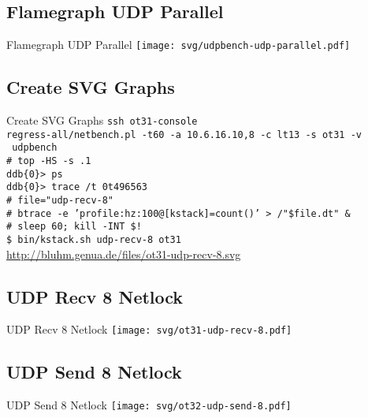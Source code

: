 \documentclass[14pt,aspectratio=169]{beamer}
\begin{document}
\subsection{Flamegraph UDP Parallel}
\begin{frame}{Flamegraph UDP Parallel}
    \texttt{[image: svg/udpbench-udp-parallel.pdf]}
\end{frame}

\subsection{Create SVG Graphs}
\begin{frame}{Create SVG Graphs}
\small
\texttt{ssh ot31-console}\\
\texttt{regress-all/netbench.pl -t60 -a 10.6.16.10,8 -c lt13 -s ot31 -v \\}
\texttt{ udpbench}\\
\texttt{\# top -HS -s .1}\\
\texttt{ddb\{0\}> ps}\\
\texttt{ddb\{0\}> trace /t 0t496563}\\
\texttt{\# file="udp-recv-8"}\\
\texttt{\# btrace -e 'profile:hz:100{@[kstack]=count()}' >~/"\$file.dt" \&}\\
\texttt{\# sleep 60; kill -INT \$!}\\
\texttt{\$ bin/kstack.sh udp-recv-8 ot31}\\
\url{http://bluhm.genua.de/files/ot31-udp-recv-8.svg}\\
\end{frame}

\subsection{UDP Recv 8 Netlock}
\begin{frame}{UDP Recv 8 Netlock}
    \texttt{[image: svg/ot31-udp-recv-8.pdf]}
\end{frame}

\subsection{UDP Send 8 Netlock}
\begin{frame}{UDP Send 8 Netlock}
    \texttt{[image: svg/ot32-udp-send-8.pdf]}
\end{frame}
\end{document}

